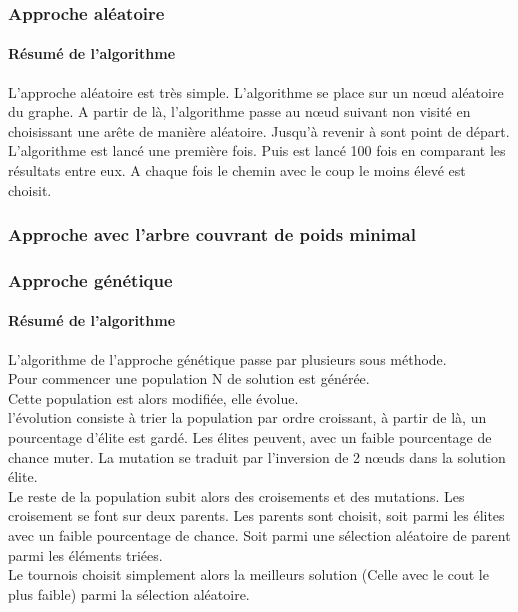 \documentclass[10pt,a4paper]{report}
\begin{document}
		\subsubsection{Approche aléatoire}
		
		\paragraph{Résumé de l'algorithme}
		L'approche aléatoire est très simple. L'algorithme se place sur un nœud aléatoire du graphe. A partir de là, l'algorithme passe au nœud suivant non visité en choisissant une arête de manière aléatoire. Jusqu'à revenir à sont point de départ.
		L'algorithme est lancé une première fois. Puis est lancé 100 fois en comparant les résultats entre eux. A chaque fois le chemin avec le coup le moins élevé est choisit.
		
		\subsubsection{Approche avec l'arbre couvrant de poids minimal}
		
		\subsubsection{Approche génétique}
		
		\paragraph{Résumé de l'algorithme}
		L'algorithme de l'approche génétique passe par plusieurs sous méthode. \\
		Pour commencer une population N de solution est générée. \\
		Cette population est alors modifiée, elle évolue. \\
		l'évolution consiste à trier la population par ordre croissant, à partir de là, un pourcentage d'élite est gardé. Les élites peuvent, avec un faible pourcentage de chance muter. La mutation se traduit par l'inversion de 2 nœuds dans la solution élite. \\
		Le reste de la population subit alors des croisements et des mutations. Les croisement se font sur deux parents. Les parents sont choisit, soit parmi les élites avec un faible pourcentage de chance. Soit parmi une sélection aléatoire de parent parmi les éléments triées. \\
		Le tournois choisit simplement alors la meilleurs solution (Celle avec le cout le plus faible) parmi la sélection aléatoire. \\
		
\end{document}
